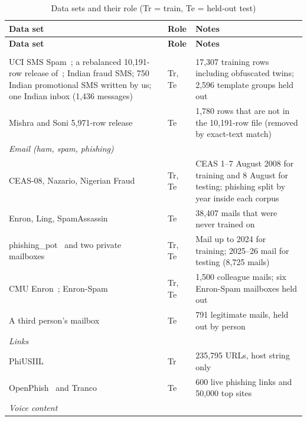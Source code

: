 {{\small{}
\begin{longtable}{|p{5.0cm}|p{1.0cm}|p{7.7cm}|}
\caption{Data sets and their role (Tr = train, Te = held-out test)}\label{tab:data}\\
\hline \textbf{Data set} & \textbf{Role} & \textbf{Notes} \\ \hline
\endfirsthead
\hline \textbf{Data set} & \textbf{Role} & \textbf{Notes} \\ \hline
\endhead
\hline
\endfoot
\multicolumn{3}{|l|}{\textit{SMS (three classes: ham, spam, smishing)}} \\ \hline
UCI SMS Spam~\cite{almeida2011sms}; a rebalanced 10{,}191-row release of~\cite{mishra2022sms}; Indian fraud SMS; 750 Indian promotional SMS written by us; one Indian inbox (1{,}436 messages) & Tr, Te & 17{,}307 training rows including obfuscated twins; 2{,}596 template groups held out \\ \hline
Mishra and Soni 5{,}971-row release~\cite{mishra2022sms} & Te & 1{,}780 rows that are not in the 10{,}191-row file (removed by exact-text match) \\ \hline
\multicolumn{3}{|l|}{\textit{Email (ham, spam, phishing)}} \\ \hline
CEAS-08, Nazario, Nigerian Fraud~\cite{alsubaiey2024dataset} & Tr, Te & CEAS 1--7 August 2008 for training and 8 August for testing; phishing split by year inside each corpus \\ \hline
Enron, Ling, SpamAssassin~\cite{alsubaiey2024dataset} & Te & 38{,}407 mails that were never trained on \\ \hline
phishing\_pot~\cite{phishingpot} and two private mailboxes & Tr, Te & Mail up to 2024 for training; 2025--26 mail for testing (8{,}725 mails) \\ \hline
CMU Enron~\cite{klimt2004enron}; Enron-Spam~\cite{metsis2006enronspam} & Tr, Te & 1{,}500 colleague mails; six Enron-Spam mailboxes held out \\ \hline
A third person's mailbox & Te & 791 legitimate mails, held out by person \\ \hline
\multicolumn{3}{|l|}{\textit{Links}} \\ \hline
PhiUSIIL~\cite{prasad2024phiusiil} & Tr & 235{,}795 URLs, host string only \\ \hline
OpenPhish~\cite{openphish} and Tranco~\cite{lepochat2019tranco} & Te & 600 live phishing links and 50{,}000 top sites \\ \hline
\multicolumn{3}{|l|}{\textit{Voice content}} \\ \hline

\end{longtable}}}
